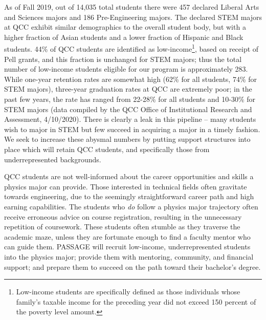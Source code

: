 \documentclass[12pt]{article}
\begin{document}
As of Fall 2019, out of 14,035 total students there were 457 declared Liberal Arts and Sciences majors and 186 Pre-Engineering majors.  The declared STEM majors at QCC exhibit similar demographics to the overall student body, but with a higher fraction of Asian students and a lower fraction of Hispanic and Black students.   44\% of QCC students are identified as low-income\footnote{Low-income students are specifically defined as those individuals whose family's taxable income for the preceding year did not exceed 150 percent of the poverty level amount.}, based on receipt of Pell grants, and this fraction is unchanged for STEM majors;  thus the total number of low-income students eligible for our program is approximately 283.  While one-year retention rates are somewhat high (62\% for all students, 74\% for STEM majors), three-year graduation rates at QCC are extremely poor; in the past few years, the rate has ranged from 22-28\% for all students and 10-30\% for STEM majors (data compiled by the QCC Office of Institutional Research and Assessment, 4/10/2020).  There is clearly a leak in this pipeline -- many students wish to major in STEM but few succeed in acquiring a major in a timely fashion.  We seek to increase these abysmal numbers by putting support structures into place which will retain QCC students, and specifically those from underrepresented backgrounds.




QCC students are not well-informed about the career opportunities and skills a physics major can provide.  
Those interested in technical fields often gravitate towards engineering, due to the seemingly straightforward career path and high earning capabilities.  The students who {\em do} follow a physics major trajectory often receive erroneous advice on course registration, resulting in the unnecessary repetition of coursework.  These students often stumble as they traverse the academic maze, unless they are fortunate enough to find a faculty mentor who can guide them.  PASSAGE will recruit low-income, underrepresented students into the physics major; provide them with mentoring, community, and financial support; and prepare them to succeed on the path toward their bachelor's degree.\\
\vspace{-3mm}
\end{document}
